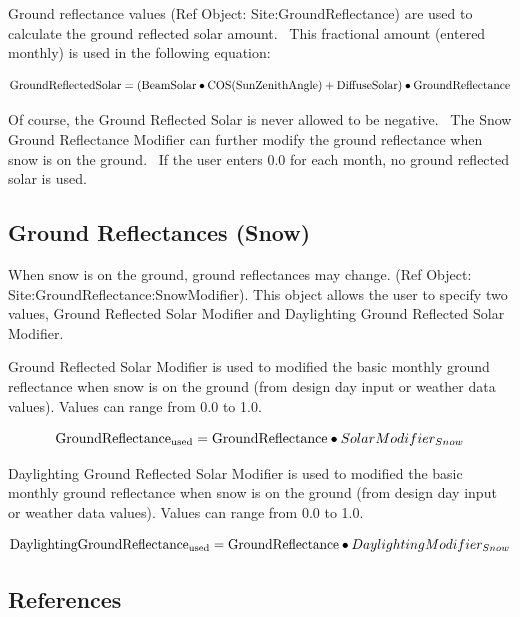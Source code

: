 Ground reflectance values (Ref Object: Site:GroundReflectance) are used to calculate the ground reflected solar amount.~ This fractional amount (entered monthly) is used in the following equation:

\begin{equation}
{\rm{GroundReflectedSolar = (BeamSolar}} \bullet {\rm{COS(SunZenithAngle) + DiffuseSolar)}} \bullet {\rm{GroundReflectance}}
\end{equation}

Of course, the Ground Reflected Solar is never allowed to be negative.~ The Snow Ground Reflectance Modifier can further modify the ground reflectance when snow is on the ground.~ If the user enters 0.0 for each month, no ground reflected solar is used.

\subsection{Ground Reflectances (Snow)}\label{ground-reflectances-snow}

When snow is on the ground, ground reflectances may change. (Ref Object: Site:\-Ground\-Re\-flect\-ance:\-Snow\-Modifier). This object allows the user to specify two values, Ground Reflected Solar Modifier and Daylighting Ground Reflected Solar Modifier.

Ground Reflected Solar Modifier is used to modified the basic monthly ground reflectance when snow is on the ground (from design day input or weather data values). Values can range from 0.0 to 1.0.

\begin{equation}
{\rm{GroundReflectanc}}{{\rm{e}}_{{\rm{used}}}} = {\rm{GroundReflectance}} \bullet SolarModifie{r_{Snow}}
\end{equation}

Daylighting Ground Reflected Solar Modifier is used to modified the basic monthly ground reflectance when snow is on the ground (from design day input or weather data values). Values can range from 0.0 to 1.0.

\begin{equation}
{\rm{DaylightingGroundReflectanc}}{{\rm{e}}_{{\rm{used}}}} = {\rm{GroundReflectance}} \bullet DaylightingModifie{r_{Snow}}
\end{equation}

\subsection{References}\label{references-041}

